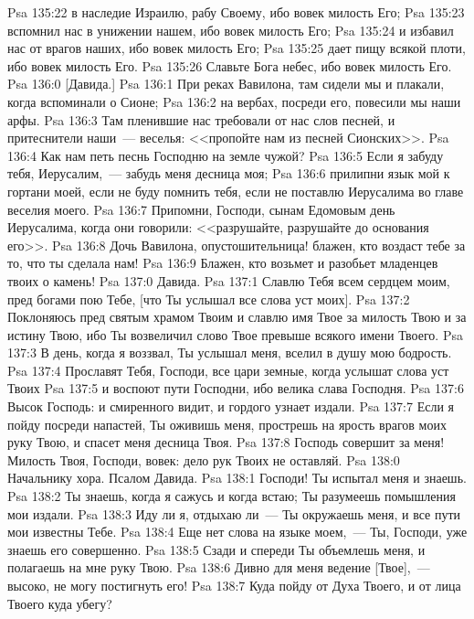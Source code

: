 \vs Psa 135:22 в наследие Израилю, рабу Своему, ибо вовек милость Его;
\vs Psa 135:23 вспомнил нас в унижении нашем, ибо вовек милость Его;
\vs Psa 135:24 и избавил нас от врагов наших, ибо вовек милость Его;
\vs Psa 135:25 дает пищу всякой плоти, ибо вовек милость Его.
\vs Psa 135:26 Славьте Бога небес, ибо вовек милость Его.
\vs Psa 136:0 [Давида.]
\rsbpar\vs Psa 136:1 При реках Вавилона, там сидели мы и плакали, когда вспоминали о Сионе;
\vs Psa 136:2 на вербах, посреди его, повесили мы наши арфы.
\vs Psa 136:3 Там пленившие нас требовали от нас слов песней, и притеснители наши~--- веселья: <<пропойте нам из песней Сионских>>.
\vs Psa 136:4 Как нам петь песнь Господню на земле чужой?
\vs Psa 136:5 Если я забуду тебя, Иерусалим,~--- забудь меня десница моя;
\vs Psa 136:6 прилипни язык мой к гортани моей, если не буду помнить тебя, если не поставлю Иерусалима во главе веселия моего.
\vs Psa 136:7 Припомни, Господи, сынам Едомовым день Иерусалима, когда они говорили: <<разрушайте, разрушайте до основания его>>.
\vs Psa 136:8 Дочь Вавилона, опустошительница! блажен, кто воздаст тебе за то, что ты сделала нам!
\vs Psa 136:9 Блажен, кто возьмет и разобьет младенцев твоих о камень!
\vs Psa 137:0 Давида.
\rsbpar\vs Psa 137:1 Славлю Тебя всем сердцем моим, пред богами пою Тебе, [что Ты услышал все слова уст моих].
\vs Psa 137:2 Поклоняюсь пред святым храмом Твоим и славлю имя Твое за милость Твою и за истину Твою, ибо Ты возвеличил слово Твое превыше всякого имени Твоего.
\vs Psa 137:3 В день, когда я воззвал, Ты услышал меня, вселил в душу мою бодрость.
\vs Psa 137:4 Прославят Тебя, Господи, все цари земные, когда услышат слова уст Твоих
\vs Psa 137:5 и воспоют пути Господни, ибо велика слава Господня.
\vs Psa 137:6 Высок Господь: и смиренного видит, и гордого узнает издали.
\vs Psa 137:7 Если я пойду посреди напастей, Ты оживишь меня, прострешь на ярость врагов моих руку Твою, и спасет меня десница Твоя.
\vs Psa 137:8 Господь совершит за меня! Милость Твоя, Господи, вовек: дело рук Твоих не оставляй.
\vs Psa 138:0 Начальнику хора. Псалом Давида.
\rsbpar\vs Psa 138:1 Господи! Ты испытал меня и знаешь.
\vs Psa 138:2 Ты знаешь, когда я сажусь и когда встаю; Ты разумеешь помышления мои издали.
\vs Psa 138:3 Иду ли я, отдыхаю ли~--- Ты окружаешь меня, и все пути мои известны Тебе.
\vs Psa 138:4 Еще нет слова на языке моем,~--- Ты, Господи, уже знаешь его совершенно.
\vs Psa 138:5 Сзади и спереди Ты объемлешь меня, и полагаешь на мне руку Твою.
\vs Psa 138:6 Дивно для меня ведение [Твое],~--- высоко, не могу постигнуть его!
\vs Psa 138:7 Куда пойду от Духа Твоего, и от лица Твоего куда убегу?

